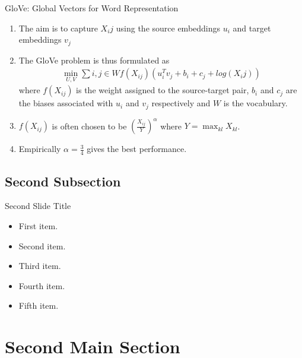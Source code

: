 \documentclass{beamer}
\begin{document}
\begin{frame}{GloVe: Global Vectors for Word Representation}
  \begin{enumerate}
   \item<2-> The aim is to capture $X_ij$ using the source embeddings $u_i$ and target embeddings $v_j$
   \item<3-> The GloVe problem is thus formulated as 
   \begin{align}
    \min_{U,V} \sum{i,j \in W} f(X_{ij})(u_i^Tv_j + b_i + c_j + log (X_ij))
   \end{align}
    where $f(X_{ij})$ is the weight assigned to the source-target pair, $b_i$ and $c_j$ are the 
    biases associated with $u_i$ and $v_j$ respectively and $W$ is the vocabulary.
    \item<4-> $f(X_{ij})$ is often chosen to be $(\frac{X_{ij}}{Y})^\alpha$ where $Y = \max_{kl}X_{kl}$.
    \item<5-> Empirically $\alpha = \frac{3}{4}$ gives the best performance.

  \end{enumerate}
  
\end{frame}


\subsection{Second Subsection}

\begin{frame}{Second Slide Title}
  \begin{itemize}
  \item {
    First item.
    \pause %
  }
  \item {   
    Second item.
  }
  \item<3-> {
    Third item.
  }
  \item<4-> {
    Fourth item.
  }
  \item<5-> {
    Fifth item. 
  }
  \end{itemize}
\end{frame}

\section{Second Main Section}
\end{document}

